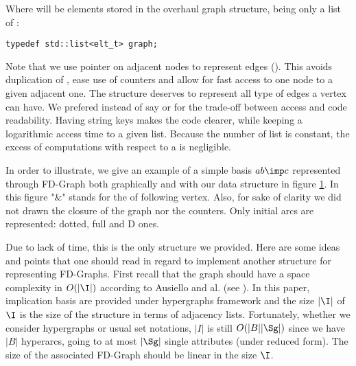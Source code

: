 \noindent Where  will be elements stored in the overhaul graph 
structure, being only a list of :

\begin{lstlisting}[language=CoreCpp, style=Light, breaklines=true]
typedef std::list<elt_t> graph;
\end{lstlisting}

\noindent Note that we use pointer on adjacent nodes to represent edges 
(). This avoids duplication of , ease use 
of counters and allow for fast access to one node to a given adjacent one. The 
 structure deserves to represent all type of edges a vertex can have.
We prefered  instead of say  or  for the 
trade-off between access and code readability. Having string keys makes the code
clearer, while keeping a logarithmic access time to a given list. Because the 
number of list is constant, the excess of computations with respect to a 
 is negligible. 

\vspace{1.2em}

In order to illustrate, we give an example of a simple basis $ab \imp c$ 
represented through FD-Graph both graphically and with our data structure in
figure \ref{fig:Graph-DS}. In this figure "\&" stands for the 
of following vertex. Also, for sake of clarity we did not drawn the closure of 
the graph nor the counters. Only initial arcs are represented: dotted, full and 
D ones. 
 

\begin{figure}[ht]
	
	\label{fig:Graph-DS}
\end{figure}

Due to lack of time, this is the only structure we provided. Here are
some ideas and points that one should read in regard to implement another 
structure for representing FD-Graphs. First recall that the graph should have
a space complexity in $O(|\I|)$ according to Ausiello and al. (see 
\cite{ausiello_minimal_1986}). In this paper, implication basis are provided
under hypergraphs framework and the size $|\I|$ of $\I$ is the size of the 
structure in terms of adjacency lists. Fortunately, whether we consider 
hypergraphs or usual set notations, $|I|$ is still $O(|B||\Sg|)$ since we 
have $|B|$ hyperarcs, going to at most $|\Sg|$ single attributes (under reduced
form). The size of the associated FD-Graph should be linear in the size $\I$.

